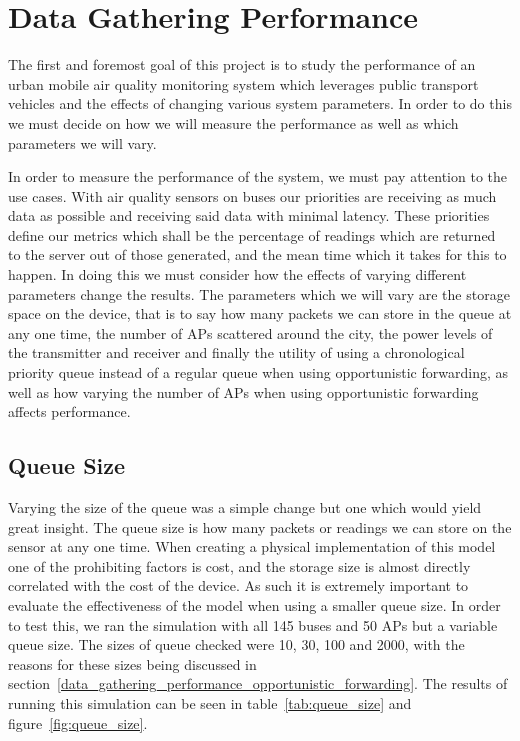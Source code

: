 \chapter{Data Gathering Performance}\label{data_gathering_performance} 

    The first and foremost goal of this project is to study the performance of an urban mobile air quality monitoring system which leverages public transport vehicles and the effects of changing various system parameters. In order to do this we must decide on how we will measure the performance as well as which parameters we will vary. 

    In order to measure the performance of the system, we must pay attention to the use cases. With air quality sensors on buses our priorities are receiving as much data as possible and receiving said data with minimal latency. These priorities define our metrics which shall be the percentage of readings which are returned to the server out of those generated, and the mean time which it takes for this to happen. In doing this we must consider how the effects of varying different parameters change the results. The parameters which we will vary are the storage space on the device, that is to say how many packets we can store in the queue at any one time, the number of APs scattered around the city, the power levels of the transmitter and receiver and finally the utility of using a chronological priority queue instead of a regular queue when using opportunistic forwarding, as well as how varying the number of APs when using opportunistic forwarding affects performance.
	

    \section{Queue Size}\label{data_gathering_performance_queue_size}

        Varying the size of the queue was a simple change but one which would yield great insight. The queue size is how many packets or readings we can store on the sensor at any one time. When creating a physical implementation of this model one of the prohibiting factors is cost, and the storage size is almost directly correlated with the cost of the device. As such it is extremely important to evaluate the effectiveness of the model when using a smaller queue size. In order to test this, we ran the simulation with all 145 buses and 50 APs but a variable queue size. The sizes of queue checked were 10, 30, 100 and 2000, with the reasons for these sizes being discussed in section~\ref{data_gathering_performance_opportunistic_forwarding}. The results of running this simulation can be seen in table~\ref{tab:queue_size} and figure~\ref{fig:queue_size}. 

